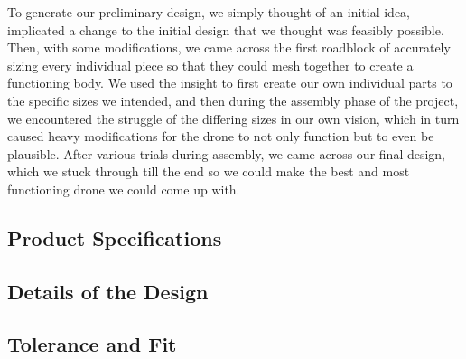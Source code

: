 

To generate our preliminary design, we simply thought of an initial idea, implicated a change to the initial design that we thought was feasibly possible. Then, with some modifications, we came across the first roadblock of accurately sizing every individual piece so that they could mesh together to create a functioning body. We used the insight to first create our own individual parts to the specific sizes we intended, and then during the assembly phase of the project, we encountered the struggle of the differing sizes in our own vision, which in turn caused heavy modifications for the drone to not only function but to even be plausible. After various trials during assembly, we came across our final design, which we stuck through till the end so we could make the best and most functioning drone we could come up with. 

\subsection{Product Specifications}

\subsection{Details of the Design}

\subsection{Tolerance and Fit}
